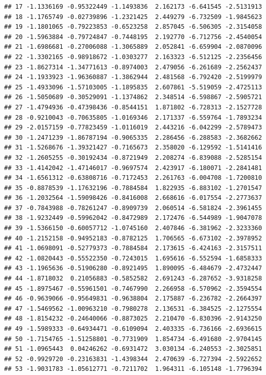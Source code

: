 \documentclass[]{article}
\begin{document}
\begin{verbatim}
## 17 -1.1336169 -0.95322449 -1.1493836  2.162173 -6.641545 -2.5131913
## 18 -1.1765749 -0.02739896 -1.2321425  2.449279 -6.732509 -1.9845623
## 19 -1.1801065 -0.79223853 -0.6523258  2.857045 -6.506305 -2.3154058
## 20 -1.5963884 -0.79724847 -0.7448195  2.192770 -6.712756 -2.4540054
## 21 -1.6986681 -0.27006088 -1.3065889  2.052841 -6.659904 -2.0870096
## 22 -1.3302165 -0.98918672 -1.0303277  2.163323 -6.512125 -2.2356456
## 23 -1.8627314 -1.34771613 -0.8974003  2.479056 -6.261689 -2.2562437
## 24 -1.1933923 -1.96360887 -1.3862944  2.481568 -6.792420 -2.5199979
## 25 -1.4933096 -1.57103005 -1.1895835  2.607861 -5.519059 -2.4725113
## 26 -1.5050689 -0.30529091 -1.1374862  2.348514 -6.598867 -2.5905721
## 27 -1.4794936 -0.47398436 -0.8544151  1.871802 -6.728313 -2.1527728
## 28 -0.9210043 -0.70635805 -1.0169346  2.171337 -6.559764 -1.7893234
## 29 -2.0157159 -0.77823459 -1.0116019  2.443216 -6.042299 -2.5789473
## 30 -1.2471239 -1.86787194 -0.9065335  2.286456 -6.288583 -2.3682662
## 31 -1.5268676 -1.39321427 -0.7165673  2.358020 -6.129592 -1.5141416
## 32 -1.2605255 -0.30192434 -0.8721949  2.208274 -6.839088 -2.5285154
## 33 -1.4142042 -1.47146017 -0.9697574  2.423917 -6.180071 -2.2841481
## 34 -1.6561312 -0.63808716 -0.7172453  2.261763 -6.004708 -1.7200810
## 35 -0.8878539 -1.17632196 -0.7884584  1.822935 -6.883102 -1.2701547
## 36 -1.2032564 -1.59098426 -0.8416008  2.668616 -6.017554 -2.2773637
## 37 -0.7843988 -0.78261247 -0.8909739  2.060514 -6.581824 -2.3961455
## 38 -1.9232449 -0.59962042 -0.8472989  2.172476 -6.544989 -1.9047078
## 39 -1.5366150 -0.60057712 -1.0745160  2.407846 -6.381962 -2.3233360
## 40 -1.2152158 -0.94952183 -0.8782125  1.706565 -6.673102 -2.3978952
## 41 -1.0698091 -0.52779373 -0.7884584  2.173615 -6.424163 -2.3157511
## 42 -1.0820443 -0.55522350 -0.7243015  1.695616 -6.552594 -1.6858333
## 43 -1.1965636 -0.51906280 -0.8921495  1.890095 -6.484679 -2.4732447
## 44 -1.8718032  0.21056883 -0.5852582  2.691243 -6.287652 -3.9318258
## 45 -1.8975467 -0.55961501 -0.7467990  2.266958 -6.570962 -2.3594554
## 46 -0.9639066 -0.95649831 -0.9638804  2.175887 -6.236782 -2.2664397
## 47 -1.5469562 -1.00963210 -0.7980278  2.136531 -6.384525 -2.1275554
## 48 -1.8154232 -0.24640066 -0.8873025  2.210470 -6.830396 -2.9143250
## 49 -1.5989333 -0.64934471 -0.6109094  2.403335 -6.736166 -2.6936615
## 50 -1.7154765 -1.51258801 -0.7731909  1.854734 -6.491680 -2.9704145
## 51 -1.0965443  0.04246262 -0.6931472  3.030134 -6.240553 -2.3025851
## 52 -0.9929720 -0.23163831 -1.4398344  2.470639 -6.727394 -2.5922652
## 53 -1.9031783 -1.05612771 -0.7211702  1.964311 -6.105148 -1.7796394

\end{verbatim}
\end{document}
